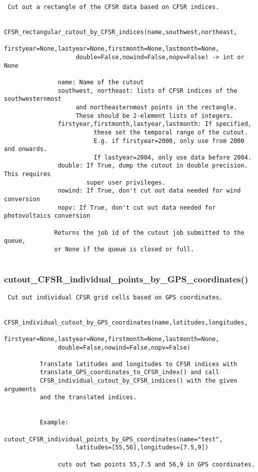 \begin{verbatim}
 Cut out a rectangle of the CFSR data based on CFSR indices.

               CFSR_rectangular_cutout_by_CFSR_indices(name,southwest,northeast,
                    firstyear=None,lastyear=None,firstmonth=None,lastmonth=None,
                    double=False,nowind=False,nopv=False) -> int or None

               name: Name of the cutout
               southwest, northeast: lists of CFSR indices of the southwesternmost
                    and northeasternmost points in the rectangle.
                    These should be 2-element lists of integers.
               firstyear,firstmonth,lastyear,lastmonth: If specified,
                         these set the temporal range of the cutout.
                         E.g. if firstyear=2000, only use from 2000 and onwards.
                         If lastyear=2004, only use data before 2004.
               double: If True, dump the cutout in double precision. This requires
                       super user privileges.
               nowind: If True, don't cut out data needed for wind conversion
               nopv: If True, don't cut out data needed for photovoltaics conversion

              Returns the job id of the cutout job submitted to the queue,
              or None if the queue is closed or full.
                       
\end{verbatim}
\subsubsection{cutout\_CFSR\_individual\_points\_by\_GPS\_coordinates()}


\begin{verbatim}
 Cut out individual CFSR grid cells based on GPS coordinates.
          
          CFSR_individual_cutout_by_GPS_coordinates(name,latitudes,longitudes,
               firstyear=None,lastyear=None,firstmonth=None,lastmonth=None,
               double=False,nowind=False,nopv=False)
     
          Translate latitudes and longitudes to CFSR indices with
          translate_GPS_coordinates_to_CFSR_index() and call
          CFSR_individual_cutout_by_CFSR_indices() with the given arguments
          and the translated indices.
          
          
          Example:
               cutout_CFSR_individual_points_by_GPS_coordinates(name="test",
                    latitudes=[55,56],longitudes=[7.5,9])

               cuts out two points 55,7.5 and 56,9 in GPS coordinates.
          
          
\end{verbatim}
